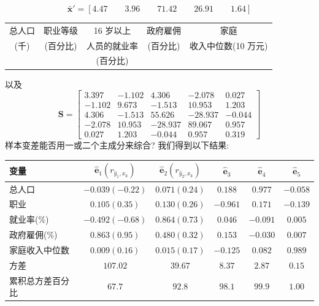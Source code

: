
\[
\bar{\mathbf{x}}'=[4.47\qquad3.96\qquad71.42\qquad26.91\qquad1.64]
\]

\begin{center}
\begin{tabular}{ccccc}
总人口 & 职业等级 & 16 岁以上 & 政府雇佣 & 家庭\\
(千) & (百分比) & 人员的就业率 & (百分比) & 收入中位数(10 万元)\\
& & (百分比) & &
\end{tabular}
\end{center}

以及
\[
\mathbf{S}=\begin{bmatrix}
3.397&-1.102&4.306&-2.078&0.027\\
-1.102&9.673&-1.513&10.953&1.203\\
4.306&-1.513&55.626&-28.937&-0.044\\
-2.078&10.953&-28.937&89.067&0.957\\
0.027&1.203&-0.044&0.957&0.319
\end{bmatrix}
\]
样本变差能否用一或二个主成分来综合? 我们得到以下结果:

\begin{mvtable}
\begin{center}\end{center}
\begin{tabular}{lccccc}
\toprule
变量 & $\hat{\mathbf{e}}_1(r_{\hat{y}_1,x_k})$ & $\hat{\mathbf{e}}_2(r_{\hat{y}_2,x_k})$ & $\hat{\mathbf{e}}_3$ & $\hat{\mathbf{e}}_4$ & $\hat{\mathbf{e}}_5$\\
\midrule
总人口 & $-0.039(-0.22)$ & $0.071(0.24)$ & $0.188$ & $0.977$ & $-0.058$\\
职业 & $0.105(0.35)$ & $0.130(0.26)$ & $-0.961$ & $0.171$ & $-0.139$\\
就业率(\%) & $-0.492(-0.68)$ & $0.864(0.73)$ & $0.046$ & $-0.091$ & $0.005$\\
政府雇佣(\%) & $0.863(0.95)$ & $0.480(0.32)$ & $0.153$ & $-0.030$ & $0.007$\\
家庭收入中位数 & $0.009(0.16)$ & $0.015(0.17)$ & $-0.125$ & $0.082$ & $0.989$\\
方差 & $107.02$ & $39.67$ & $8.37$ & $2.87$ & $0.15$\\
累积总方差百分比 & $67.7$ & $92.8$ & $98.1$ & $99.9$ & $1.00$\\
\bottomrule
\end{tabular}
\end{mvtable}

